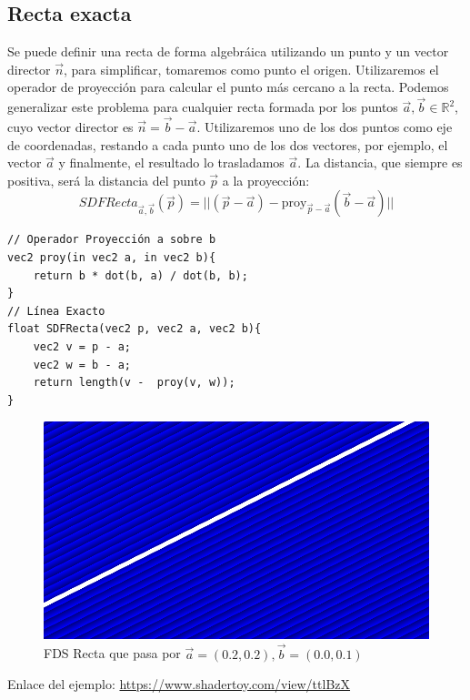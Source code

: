 \subsection{Recta exacta}
Se puede definir una recta de forma algebráica utilizando un punto y un vector director \(\Vec{n}\), para simplificar, tomaremos como punto el origen. Utilizaremos el operador de proyección 
para calcular el punto más cercano a la recta.
Podemos generalizar este problema para cualquier recta formada por los puntos \(\Vec{a},\Vec{b}\in\mathbb{R}^2\), cuyo vector director es 
\(\Vec{n}=\Vec{b}-\Vec{a}\). Utilizaremos uno de los dos puntos como eje de coordenadas, restando a cada punto uno de los dos vectores, por ejemplo, el vector \(\Vec{a}\) y finalmente, el resultado lo trasladamos \(\Vec{a}\). La distancia, que siempre es positiva, será la distancia del punto \(\Vec{p}\) a la proyección:
\[SDFRecta_{\Vec{a},\Vec{b}}(\Vec{p})=\vert\vert (\Vec{p}-\Vec{a}) - \text{proy}_{\Vec{p}-\Vec{a}}\left(\Vec{b}-\Vec{a}\right)\vert\vert\]

\begin{lstlisting}
// Operador Proyección a sobre b
vec2 proy(in vec2 a, in vec2 b){
    return b * dot(b, a) / dot(b, b);
}
// Línea Exacto
float SDFRecta(vec2 p, vec2 a, vec2 b){
    vec2 v = p - a;
    vec2 w = b - a;
    return length(v -  proy(v, w));
}
\end{lstlisting}
\begin{figure}[H]
  \centering
  \captionsetup{justification=centering}%
  \includegraphics[width=1.0\textwidth]{secciones/imagenes/sdf/2d/sdf_recta.png}
  \caption{FDS Recta que pasa por \(\Vec{a}=(0.2, 0.2), \Vec{b}=(0.0, 0.1)\)}
  \label{fig:recta}
\end{figure}

Enlace del ejemplo: \url{https://www.shadertoy.com/view/ttlBzX}

